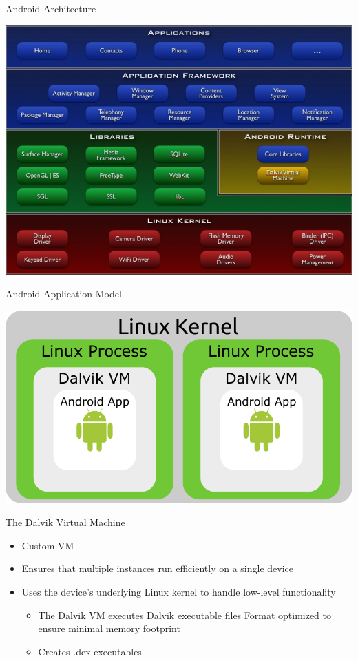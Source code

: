 \begin{frame}{Android Architecture}
\begin{center}
    \includegraphics[scale=0.36]{images/architecture}
\end{center}
\end{frame}

\begin{frame}{Android Application Model}
\begin{center}
\includegraphics[scale=0.6]{images/application_model}
\end{center}
\end{frame}

\begin{frame}{The Dalvik Virtual Machine}
\begin{itemize}
  \item Custom VM
  \item Ensures that multiple instances run efficiently
on a single device
  \item Uses the device's underlying Linux kernel to
handle low-level functionality
    \begin{itemize}
        \item The Dalvik VM executes Dalvik executable files
        Format optimized to ensure minimal memory
        footprint
        \item Creates .dex executables
    \end{itemize}
\end{itemize}
\end{frame}

